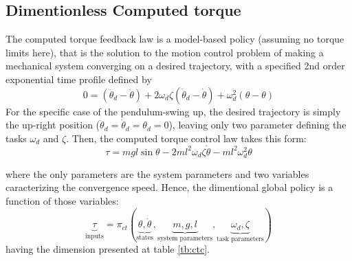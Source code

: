 \subsection{Dimentionless Computed torque}

The computed torque feedback law is a model-based policy (assuming no torque limits here), that is the solution to the motion control problem of making a mechanical system converging on a desired trajectory, with a specified 2nd order exponential time profile defined by
\begin{equation}
0 = (\ddot{\theta}_d - \ddot{\theta})+ 2 \omega_d \zeta (\dot{\theta}_d - \dot{\theta}) + \omega_d^2 (\theta - \theta)
\end{equation}
For the specific case of the pendulum-swing up, the desired trajectory is simply the up-right position ($\ddot{\theta}_d = \dot{\theta}_d = \theta_d = 0$), leaving only two parameter defining the tasks $\omega_d$ and $\zeta$. Then, the computed torque control law takes this form:
\begin{equation}
\tau = mgl \sin \theta - 2 m l^2 \omega_d \zeta \dot{\theta} - m l^2 \omega_d^2 \theta
\label{eq:ct}
\end{equation}

where the only parameters are the system parameters and two variables caracterizing the convergence speed. Hence, the dimentional global policy is a function of those variables:
\begin{equation}
\underbrace{\tau}_{\text{inputs}}
=
\pi_{ct} \left(
\underbrace{ \theta, \dot{\theta} }_{\text{states}},
\underbrace{ m , g , l }_{\text{system parameters}},
\underbrace{ \omega_d , \zeta }_{\text{task parameters}}
\right)
\label{tb:ctc}
\end{equation}
having the dimension presented at table \ref{tb:ctc}.

